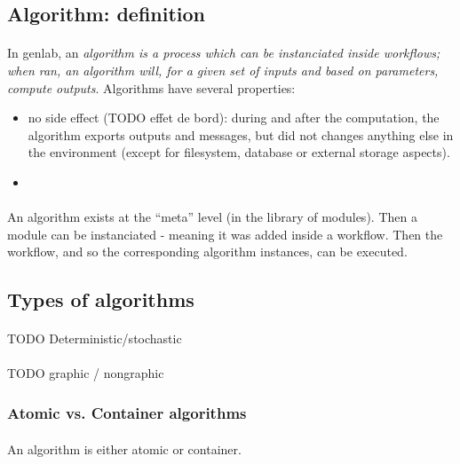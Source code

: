 \documentclass[a4paper,10pt]{book}
\begin{document}
\subsection{Algorithm: definition}

\paragraph*{}
In genlab, an \textit{algorithm is a process which can be instanciated inside workflows; when ran, an algorithm will, for a given set of inputs and based on parameters, compute outputs}. Algorithms have several properties:
\begin{itemize}
\item no side effect (TODO effet de bord): during and after the computation, the algorithm exports outputs and messages, but did not changes anything else in the environment (except for filesystem, database or external storage aspects).
\item 
\end{itemize}

\paragraph*{}
An algorithm exists at the ``meta'' level (in the library of modules). Then a module can be instanciated - meaning it was added inside a workflow. Then the workflow, and so the corresponding algorithm instances, can be executed.

\subsection{Types of algorithms}

\paragraph*{}
TODO Deterministic/stochastic

\paragraph*{}
TODO graphic / nongraphic


\subsubsection{Atomic vs. Container algorithms}

\paragraph*{}
An algorithm is either atomic or container.
\end{document}
